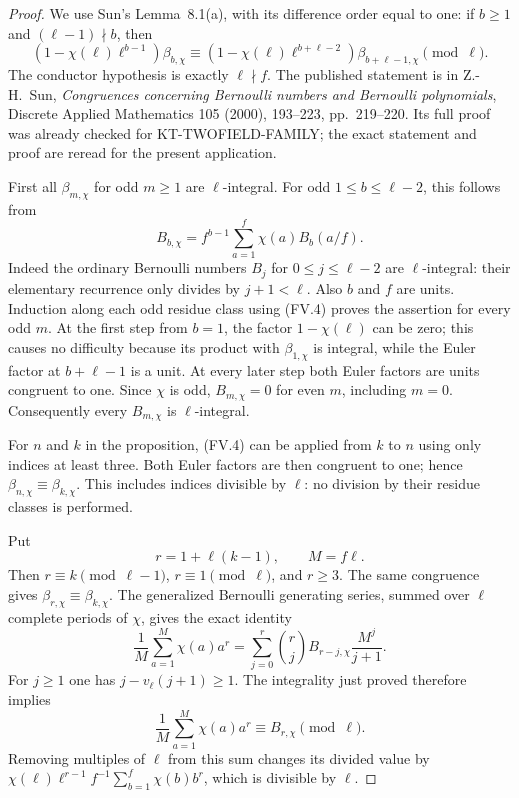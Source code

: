 \begin{proof}
We use Sun's Lemma~8.1(a), with its difference order equal to one:
if $b\geq1$ and $(\ell-1)\nmid b$, then
\[
 (1-\chi(\ell)\ell^{b-1})\beta_{b,\chi}
 \equiv
 (1-\chi(\ell)\ell^{b+\ell-2})\beta_{b+\ell-1,\chi}
                                  \pmod\ell.               \tag{FV.4}
\]
The conductor hypothesis is exactly $\ell\nmid f$.  The published
statement is in Z.-H.~Sun, \emph{Congruences concerning Bernoulli
numbers and Bernoulli polynomials}, Discrete Applied Mathematics
105 (2000), 193--223, pp.~219--220.  Its full proof was already
checked for KT-TWOFIELD-FAMILY; the exact statement and proof are
reread for the present application.

First all $\beta_{m,\chi}$ for odd $m\geq1$ are $\ell$-integral.
For odd $1\leq b\leq\ell-2$, this follows from
\[
 B_{b,\chi}=f^{b-1}\sum_{a=1}^{f}\chi(a)B_b(a/f).
\]
Indeed the ordinary Bernoulli numbers $B_j$ for $0\leq j\leq\ell-2$
are $\ell$-integral: their elementary recurrence only divides by
$j+1<\ell$.  Also $b$ and $f$ are units.  Induction along each odd
residue class using (FV.4) proves the assertion for every odd $m$.
At the first step from $b=1$, the factor $1-\chi(\ell)$ can be zero;
this causes no difficulty because its product with $\beta_{1,\chi}$
is integral, while the Euler factor at $b+\ell-1$ is a unit.
At every later step both Euler factors are units congruent to one.
Since $\chi$ is odd, $B_{m,\chi}=0$ for even $m$, including $m=0$.
Consequently every $B_{m,\chi}$ is $\ell$-integral.

For $n$ and $k$ in the proposition, (FV.4) can be applied from $k$
to $n$ using only indices at least three.  Both Euler factors are
then congruent to one; hence $\beta_{n,\chi}\equiv\beta_{k,\chi}$.
This includes indices divisible by $\ell$: no division by their
residue classes is performed.

Put
\[
                        r=1+\ell(k-1),\qquad M=f\ell.
\]
Then $r\equiv k\pmod{\ell-1}$, $r\equiv1\pmod\ell$, and $r\geq3$.
The same congruence gives $\beta_{r,\chi}\equiv\beta_{k,\chi}$.
The generalized Bernoulli generating series, summed over $\ell$
complete periods of $\chi$, gives the exact identity
\[
 \frac1M\sum_{a=1}^{M}\chi(a)a^r
   =\sum_{j=0}^{r}\binom rj B_{r-j,\chi}\frac{M^j}{j+1}.
                                                               \tag{FV.5}
\]
For $j\geq1$ one has $j-v_\ell(j+1)\geq1$.  The integrality just
proved therefore implies
\[
 \frac1M\sum_{a=1}^{M}\chi(a)a^r\equiv B_{r,\chi}\pmod\ell.
                                                               \tag{FV.6}
\]
Removing multiples of $\ell$ from this sum changes its divided
value by
$\chi(\ell)\ell^{r-1}f^{-1}\sum_{b=1}^{f}\chi(b)b^r$,
which is divisible by $\ell$.


\end{proof}
